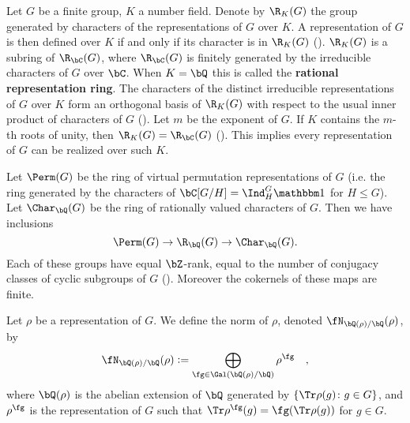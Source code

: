 Let $G$ be a finite group, $K$ a number field.
Denote by $\R_K(G)$ the group generated by characters of the representations of $G$ over $K$. A representation of $G$ is then defined over $K$ if and only if its character is in $\R_K(G)$ (\cite[Proposition 33]{Serre}).
$\R_K(G)$ is a subring of $\R_{\bC}(G)$, where $\R_{\bC}(G)$ is finitely generated by the irreducible characters of $G$ over $\bC$.
When $K = \bQ$ this is called the \textbf{rational representation ring}.
The characters of the distinct irreducible representations of $G$ over $K$ form an orthogonal basis of $\R_K(G)$ with respect to the usual inner product of characters of $G$ (\cite[Proposition 32]{Serre}).
Let $m$ be the exponent of $G$. If $K$ contains the $m$-th roots of unity, then $\R_K(G) = \R_{\bC}(G)$ (\cite[Theorem 24]{Serre}). This implies every representation of $G$ can be realized over such $K$. 
\vspace{1em}

Let $\Perm(G)$ be the ring of virtual permutation representations of $G$ (i.e. the ring generated by the characters of $\bC[G / H] = \Ind_{H}^G \trivial$ for $H \leq G$). Let $\Char_{\bQ}(G)$ be the ring of rationally valued characters of $G$. Then we have inclusions 
\[ \Perm(G) \to \R_{\bQ}(G) \to \Char_{\bQ}(G). \]
Each of these groups have equal $\bZ$-rank, equal to the number of conjugacy classes of cyclic subgroups of $G$ (\cite[Chapter 13, \S13.1]{Serre}). Moreover the cokernels of these maps are finite.

\begin{defn}\label{rho-norm}
    Let $\rho$ be a representation of $G$. We define the norm of $\rho$, denoted $\repnorm{\rho}$, by 
    \[
    \repnorm{\rho} \defeq \bigoplus_{\fg \in \Gal(\bQ(\rho)/\bQ)}  \rho^\fg \quad,
    \]
    where $\bQ(\rho)$ is the abelian extension of $\bQ$ generated by $\{ \Tr \rho(g) \colon g \in G \}$, and $\rho^\fg$ is the representation of $G$ such that $\Tr \rho^{\fg}(g) = \fg(\Tr \rho(g))$ for $g \in G$. 
\end{defn}


